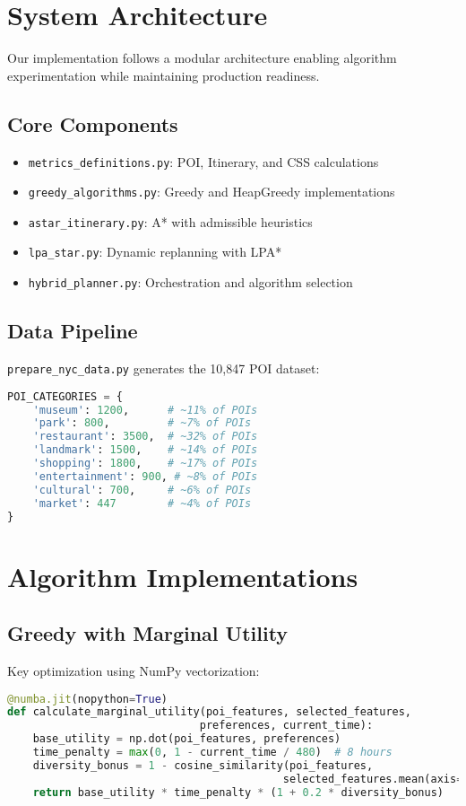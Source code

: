 
\section{System Architecture}

Our implementation follows a modular architecture enabling algorithm experimentation while maintaining production readiness.

\subsection{Core Components}
\begin{itemize}
    \item \texttt{metrics\_definitions.py}: POI, Itinerary, and CSS calculations
    \item \texttt{greedy\_algorithms.py}: Greedy and HeapGreedy implementations
    \item \texttt{astar\_itinerary.py}: A* with admissible heuristics
    \item \texttt{lpa\_star.py}: Dynamic replanning with LPA*
    \item \texttt{hybrid\_planner.py}: Orchestration and algorithm selection
\end{itemize}

\subsection{Data Pipeline}
\texttt{prepare\_nyc\_data.py} generates the 10,847 POI dataset:
\begin{lstlisting}[language=Python]
POI_CATEGORIES = {
    'museum': 1200,      # ~11% of POIs
    'park': 800,         # ~7% of POIs  
    'restaurant': 3500,  # ~32% of POIs
    'landmark': 1500,    # ~14% of POIs
    'shopping': 1800,    # ~17% of POIs
    'entertainment': 900, # ~8% of POIs
    'cultural': 700,     # ~6% of POIs
    'market': 447        # ~4% of POIs
}
\end{lstlisting}

\section{Algorithm Implementations}

\subsection{Greedy with Marginal Utility}
Key optimization using NumPy vectorization:
\begin{lstlisting}[language=Python]
@numba.jit(nopython=True)
def calculate_marginal_utility(poi_features, selected_features, 
                              preferences, current_time):
    base_utility = np.dot(poi_features, preferences)
    time_penalty = max(0, 1 - current_time / 480)  # 8 hours
    diversity_bonus = 1 - cosine_similarity(poi_features, 
                                           selected_features.mean(axis=0))
    return base_utility * time_penalty * (1 + 0.2 * diversity_bonus)
\end{lstlisting}

